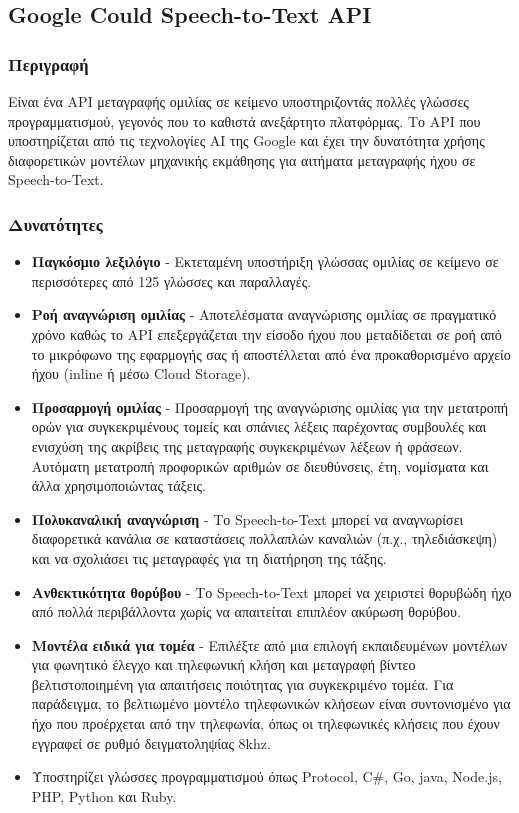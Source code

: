 \documentclass[oneside, 12pt]{book}
\begin{document}
\subsection{Google Could Speech-to-Text API}
\label{subsec:google-speech-to-text}
\subsubsection{Περιγραφή}
Είναι ένα API μεταγραφής ομιλίας σε κείμενο υποστηριζοντάς πολλές γλώσσες προγραμματισμού, γεγονός που το καθιστά ανεξάρτητο πλατφόρμας. Το API που υποστηρίζεται από τις τεχνολογίες AI της Google και έχει την δυνατότητα χρήσης διαφορετικών μοντέλων μηχανικής εκμάθησης για αιτήματα μεταγραφής ήχου σε Speech-to-Text.
\subsubsection{Δυνατότητες}
\begin{itemize}
  \item \textbf{Παγκόσμιο λεξιλόγιο} - Εκτεταμένη υποστήριξη γλώσσας ομιλίας σε κείμενο σε περισσότερες από 125 γλώσσες και παραλλαγές.
  \item \textbf{Ροή αναγνώριση ομιλίας} - Αποτελέσματα αναγνώρισης ομιλίας σε πραγματικό χρόνο καθώς το API επεξεργάζεται την είσοδο ήχου που μεταδίδεται σε ροή από το μικρόφωνο της εφαρμογής σας ή αποστέλλεται από ένα προκαθορισμένο αρχείο ήχου (inline ή μέσω Cloud Storage).
  \item \textbf{Προσαρμογή ομιλίας} - Προσαρμογή της αναγνώρισης ομιλίας για την μετατροπή ορών για συγκεκριμένους τομείς και σπάνιες λέξεις παρέχοντας συμβουλές και ενισχύση της ακρίβεις της μεταγραφής συγκεκριμένων λέξεων ή φράσεων. Αυτόματη μετατροπή προφορικών αριθμών σε διευθύνσεις, έτη, νομίσματα και άλλα χρησιμοποιώντας τάξεις.
  \item \textbf{Πολυκαναλική αναγνώριση} - Το Speech-to-Text μπορεί να αναγνωρίσει διαφορετικά κανάλια σε καταστάσεις πολλαπλών καναλιών (π.χ., τηλεδιάσκεψη) και να σχολιάσει τις μεταγραφές για τη διατήρηση της τάξης.
  \item \textbf{Ανθεκτικότητα θορύβου} - Το Speech-to-Text μπορεί να χειριστεί θορυβώδη ήχο από πολλά περιβάλλοντα χωρίς να απαιτείται επιπλέον ακύρωση θορύβου.
  \item \textbf{Μοντέλα ειδικά για τομέα} - Επιλέξτε από μια επιλογή εκπαιδευμένων μοντέλων για φωνητικό έλεγχο και τηλεφωνική κλήση και μεταγραφή βίντεο βελτιστοποιημένη για απαιτήσεις ποιότητας για συγκεκριμένο τομέα. Για παράδειγμα, το βελτιωμένο μοντέλο τηλεφωνικών κλήσεων είναι συντονισμένο για ήχο που προέρχεται από την τηλεφωνία, όπως οι τηλεφωνικές κλήσεις που έχουν εγγραφεί σε ρυθμό δειγματοληψίας 8khz.
  \item Υποστηρίζει γλώσσες προγραμματισμού όπως Protocol, C\#, Go, java, Node.js, PHP, Python και Ruby.
\end{itemize}
\end{document}
